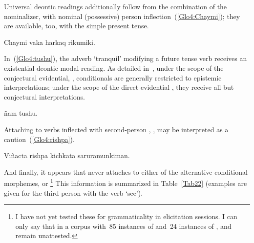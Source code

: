 \noindent
Universal deontic readings additionally follow from the combination of the nominalizer,  with nominal (possessive) person inflection~(\ref{Glo4:Chaymi}); they are available, too, with the simple present tense.

%
{Chaymi vaka harkaq rikumiki.}%
{}%
{}{}%

\noindent
In~(\ref{Glo4:tushu}), the adverb  ‘tranquil’ modifying a future tense verb receives an existential deontic modal reading. As detailed in~, under the scope of the conjectural evidential, , conditionals are generally restricted to epistemic interpretations; under the scope of the direct evidential , they receive all but conjectural interpretations.

%
{ñam tushu.}%
{}%
{}{}%

\noindent
Attaching to verbs inflected with second-person , , may be interpreted as a caution~(\ref{Glo4:rishpa}).

%
{Viñacta rishpa kichkata  saruramunkiman.}%
{}%
{}{}%

\noindent
And finally, it appears that  never attaches to either of the alternative-conditional morphemes,  or \footnote{I have not yet tested these for grammaticality in elicitation sessions. I can only say that in a corpus with~85 instances of  and~24 instances of ,  and  remain unattested.} This information is summarized in Table~\ref{Tab22} (examples are given for the third person with the verb  ‘see’).

